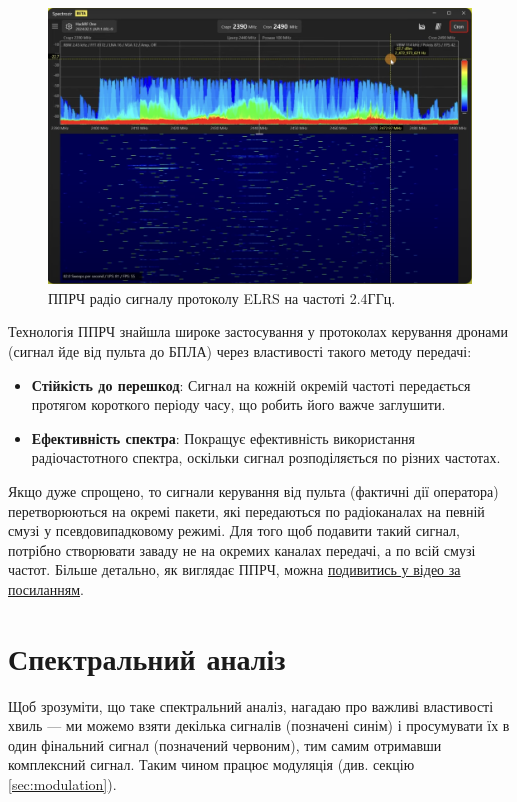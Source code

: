 \documentclass{article}
\begin{document}
\begin{figure}[H]
\centering
\includegraphics[width=0.7\linewidth]{images/freq-hope.png}
\caption{\label{fig:hf}ППРЧ радіо сигналу протоколу ELRS на частоті 2.4ГГц.}
\end{figure}

Технологія ППРЧ знайшла широке застосування у протоколах керування дронами (сигнал йде від пульта до БПЛА) через властивості такого методу передачі:
\begin{itemize}[noitemsep, topsep=8pt]
\item \textbf{Стійкість до перешкод}: Сигнал на кожній окремій частоті передається протягом короткого періоду часу, що робить його важче заглушити.
\item \textbf{Ефективність спектра}: Покращує ефективність використання радіочастотного спектра, оскільки сигнал розподіляється по різних частотах.
\end{itemize}

Якщо дуже спрощено, то сигнали керування від пульта (фактичні дії оператора) перетворюються на окремі пакети, які передаються по радіоканалах на певній смузі у псевдовипадковому режимі. Для того щоб подавити такий сигнал, потрібно створювати заваду не на окремих каналах передачі, а по всій смузі частот. Більше детально, як виглядає ППРЧ, можна \href{https://www.youtube.com/watch?v=REyNJcrZHII}{подивитись у відео за посиланням}.


\section{Спектральний аналіз}

Щоб зрозуміти, що таке спектральний аналіз, нагадаю про важливі властивості хвиль --- ми можемо взяти декілька сигналів (позначені синім) і просумувати їх в один фінальний сигнал (позначений червоним), тим самим отримавши комплексний сигнал. Таким чином працює модуляція (див. секцію \ref{sec:modulation}).
\end{document}
